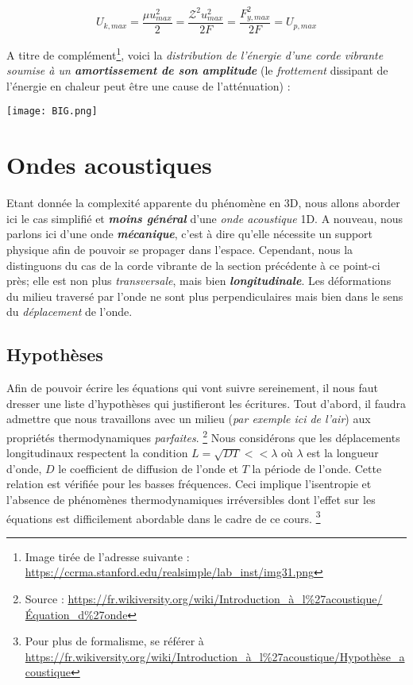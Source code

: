 \[ U_{k,max} = \frac{\mu u_{max}^{2}}{2} =   \frac{\mathcal{Z}^{2} u_{max}^{2}}{2F} = \frac{F_{y,max}^{2}}{2F} = U_{p,max}\]

A titre de complément\footnote{Image tirée de l'adresse suivante : \url{https://ccrma.stanford.edu/realsimple/lab_inst/img31.png}}, voici la \textit{distribution de l'énergie d'une corde vibrante soumise à un \textbf{amortissement de son amplitude}} (le \textit{frottement }dissipant de l'énergie en chaleur peut être une cause de l'atténuation) : 
\begin{center}
	\texttt{[image: BIG.png]}
\end{center}

\section{Ondes acoustiques}

Etant donnée la complexité apparente du phénomène en 3D, nous allons aborder ici le cas simplifié et \textit{\textbf{moins général}} d'une 
\textit{onde acoustique} 1D. A nouveau, nous parlons ici d'une onde \textit{\textbf{mécanique}}, c'est à dire qu'elle nécessite un support physique afin 
de pouvoir se propager dans l'espace. Cependant, nous la distinguons du cas de la corde vibrante de la section précédente à ce point-ci près; 
elle est non plus \textit{transversale}, mais bien \textit{\textbf{longitudinale}}. Les déformations du milieu traversé par l'onde ne sont plus perpendiculaires mais 
bien dans le sens du
\textit{déplacement}
de l'onde.

\subsection{Hypothèses}

Afin de pouvoir écrire les équations qui vont suivre sereinement, il nous faut dresser une liste d'hypothèses qui justifieront les écritures. 
Tout d'abord, il faudra admettre que nous travaillons avec un milieu (\textit{par exemple ici de l'air}) aux propriétés thermodynamiques \textit{parfaites}. \footnote{Source : \url{https://fr.wikiversity.org/wiki/Introduction_à_l\%27acoustique/Équation_d\%27onde}}
Nous considérons que les déplacements longitudinaux respectent la condition $L = \sqrt{DT} << \lambda$ où $\lambda$ est la longueur d'onde, $D$ le coefficient de diffusion de l'onde et 
$T$ la période de l'onde. Cette relation est vérifiée pour les basses fréquences. Ceci implique l'isentropie et l'absence de phénomènes thermodynamiques irréversibles dont l'effet sur les équations est difficilement abordable dans le cadre de ce cours. \footnote{Pour plus de formalisme, se référer à \url{https://fr.wikiversity.org/wiki/Introduction_à_l\%27acoustique/Hypothèse_acoustique}}

